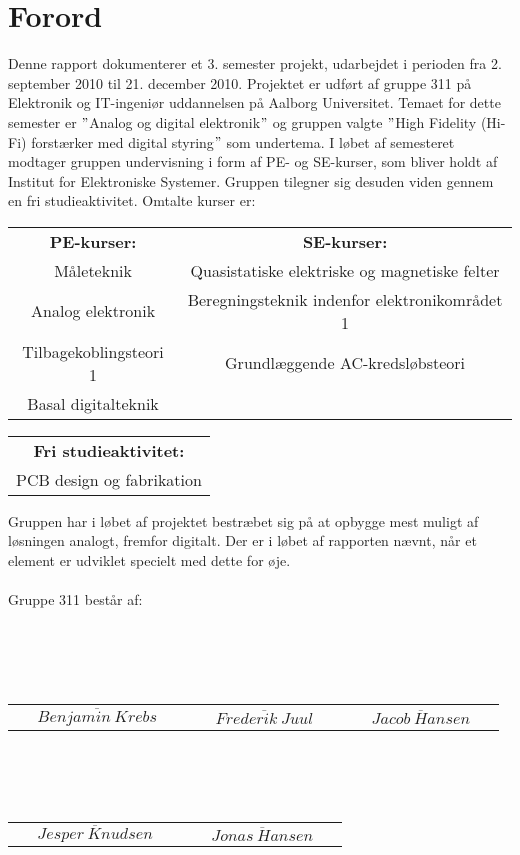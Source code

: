 \chapter*{Forord}
\label{forord}
Denne rapport dokumenterer et 3. semester projekt, udarbejdet i perioden fra 2. september 2010 til 21. december 2010. Projektet er udført af gruppe 311 på Elektronik og IT-ingeniør uddannelsen på Aalborg Universitet. Temaet for dette semester er $"$Analog og digital elektronik$"$ og gruppen valgte $"$High Fidelity (Hi-Fi) forstærker med digital styring$"$ som undertema. I løbet af semesteret modtager gruppen undervisning i form af PE- og SE-kurser, som bliver holdt af Institut for Elektroniske Systemer. Gruppen tilegner sig desuden viden gennem en fri studieaktivitet. Omtalte kurser er:

\begin{table}[h]
\centering
\begin{tabular}{c c}
\textbf{PE-kurser:} & \textbf{SE-kurser:} \\
Måleteknik & Quasistatiske elektriske og magnetiske felter \\
Analog elektronik & Beregningsteknik indenfor elektronikområdet 1 \\
Tilbagekoblingsteori 1 & Grundlæggende AC-kredsløbsteori \\
Basal digitalteknik & \\
\end{tabular}
\label{tab:kurser1}
\end{table}
\begin{table}[h]
\centering
\begin{tabular}{c}
\textbf{Fri studieaktivitet:} \\
PCB design og fabrikation \\
\end{tabular}
\label{tab:kurser2}
\end{table}
Gruppen har i løbet af projektet bestræbet sig på at opbygge mest muligt af løsningen analogt, fremfor digitalt. Der er i løbet af rapporten nævnt, når et element er udviklet specielt med dette for øje.\\\\
Gruppe 311 består af: \\\\\\\\\\
\begin{table}[h]
\centering
\begin{tabular}{c c c}
$\overline{~~~~~~Benjamin~Krebs~~~~~~}$ & $\overline{~~~~~~Frederik~Juul~~~~~~}$ & $\overline{~~~~~~Jacob~Hansen~~~~~~}$\\
\end{tabular}
\label{tab:gruppemedlemmer1}
\end{table} \\\\\\
\begin{table}[h]
\centering
\begin{tabular}{c c}
$\overline{~~~~~~Jesper~Knudsen~~~~~~}$ & $\overline{~~~~~~Jonas~Hansen~~~~~~}$\\
\end{tabular}
\label{tab:gruppemedlemmer2}
\end{table}